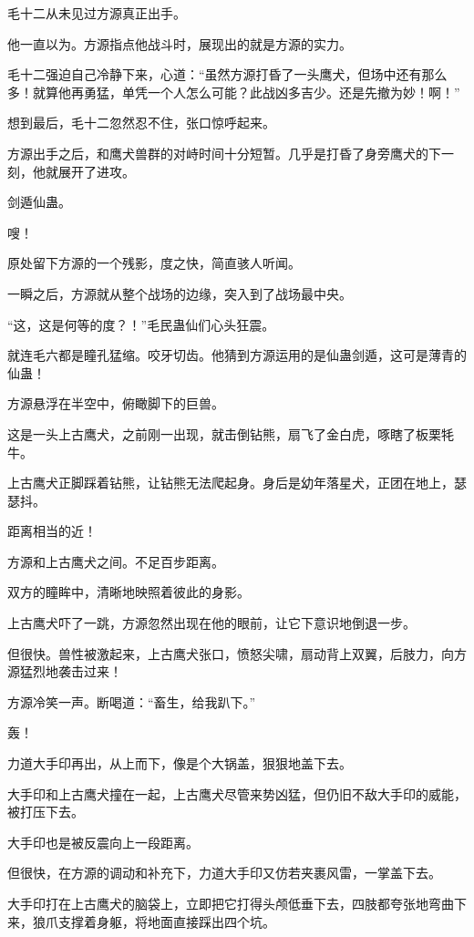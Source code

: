 \begin{this_body}
毛十二从未见过方源真正出手。

他一直以为。方源指点他战斗时，展现出的就是方源的实力。

毛十二强迫自己冷静下来，心道：“虽然方源打昏了一头鹰犬，但场中还有那么多！就算他再勇猛，单凭一个人怎么可能？此战凶多吉少。还是先撤为妙！啊！”

想到最后，毛十二忽然忍不住，张口惊呼起来。

方源出手之后，和鹰犬兽群的对峙时间十分短暂。几乎是打昏了身旁鹰犬的下一刻，他就展开了进攻。

剑遁仙蛊。

嗖！

原处留下方源的一个残影，度之快，简直骇人听闻。

一瞬之后，方源就从整个战场的边缘，突入到了战场最中央。

“这，这是何等的度？！”毛民蛊仙们心头狂震。

就连毛六都是瞳孔猛缩。咬牙切齿。他猜到方源运用的是仙蛊剑遁，这可是薄青的仙蛊！

方源悬浮在半空中，俯瞰脚下的巨兽。

这是一头上古鹰犬，之前刚一出现，就击倒钻熊，扇飞了金白虎，啄瞎了板栗牦牛。

上古鹰犬正脚踩着钻熊，让钻熊无法爬起身。身后是幼年落星犬，正团在地上，瑟瑟抖。

距离相当的近！

方源和上古鹰犬之间。不足百步距离。

双方的瞳眸中，清晰地映照着彼此的身影。

上古鹰犬吓了一跳，方源忽然出现在他的眼前，让它下意识地倒退一步。

但很快。兽性被激起来，上古鹰犬张口，愤怒尖啸，扇动背上双翼，后肢力，向方源猛烈地袭击过来！

方源冷笑一声。断喝道：“畜生，给我趴下。”

轰！

力道大手印再出，从上而下，像是个大锅盖，狠狠地盖下去。

大手印和上古鹰犬撞在一起，上古鹰犬尽管来势凶猛，但仍旧不敌大手印的威能，被打压下去。

大手印也是被反震向上一段距离。

但很快，在方源的调动和补充下，力道大手印又仿若夹裹风雷，一掌盖下去。

大手印打在上古鹰犬的脑袋上，立即把它打得头颅低垂下去，四肢都夸张地弯曲下来，狼爪支撑着身躯，将地面直接踩出四个坑。


\end{this_body}
